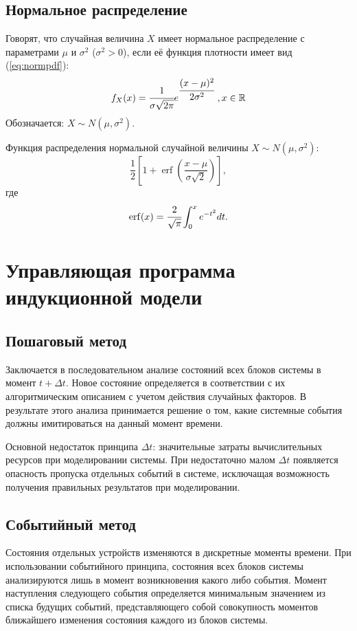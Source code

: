 \subsection{Нормальное распределение}
Говорят, что случайная величина $X$ имеет нормальное распределение с параметрами $\mu$ и $\sigma^2$ ($\sigma^2 > 0$), если её функция плотности имеет вид (\ref{eq:normpdf}):
\begin{equation}\label{eq:normpdf}
	f_{X}(x) = \cfrac{1}{\sigma\sqrt{2\pi}}e^{\cfrac{(x - \mu)^2}{2\sigma^2}}\;, x \in \mathbb{R}
\end{equation}
Обозначается: $X\sim N(\mu, \sigma^2)$.

Функция распределения нормальной случайной величины $X\sim N(\mu, \sigma^2)$:
\begin{equation}\label{eq:normcdf}
	\frac {1}{2}\left[1+\operatorname {erf} \left({\frac {x-\mu }{\sigma {\sqrt {2}}}}\right)\right],
\end{equation}
где
\begin{equation}\label{eq:erf}
	\operatorname {erf} (x)=\cfrac {2}{\sqrt {\pi}}\int_{0}^{x}e^{-t^2}dt.
\end{equation}

\section{Управляющая программа индукционной модели}

\subsection{Пошаговый метод}
Заключается в последовательном анализе состояний всех блоков системы в момент $t + \Delta t$. Новое состояние определяется в соответствии с их алгоритмическим описанием с учетом действия случайных факторов. В результате этого анализа принимается решение о том, какие системные события должны имитироваться на данный момент времени. 

Основной недостаток принципа $\Delta t$: значительные затраты вычислительных ресурсов при моделировании системы. При недостаточно малом $\Delta t$ появляется опасность пропуска отдельных событий в системе, исключащая возможность получения правильных результатов при моделировании. 


\subsection{Событийный метод}
Состояния отдельных устройств изменяются в дискретные моменты времени. При использовании событийного принципа, состояния всех блоков системы анализируются лишь в момент возникновения какого либо события. Момент наступления следующего события определяется минимальным значением из списка будущих событий, представляющего собой совокупность моментов ближайшего изменения состояния каждого из блоков системы.